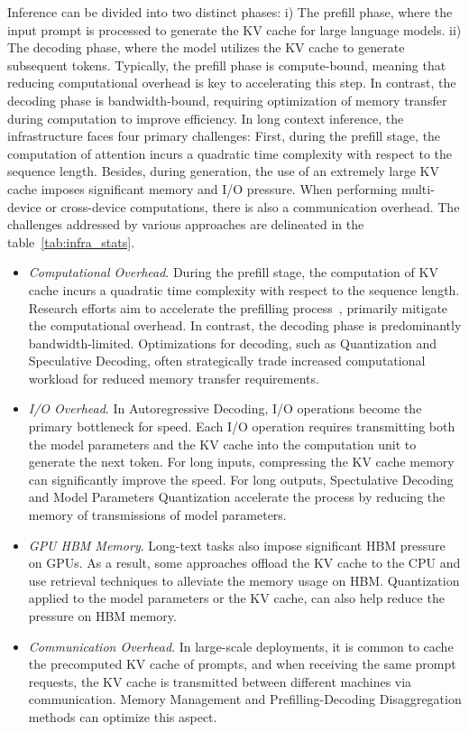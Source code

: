\documentclass[11pt, a4paper, logo, copyright, nonumbering]{map}
\begin{document}
Inference can be divided into two distinct phases: i) The prefill phase, where the input prompt is processed to generate the KV cache for large language models.
ii) The decoding phase, where the model utilizes the KV cache to generate subsequent tokens. Typically, the prefill phase is compute-bound, meaning that reducing computational overhead is key to accelerating this step. In contrast, the decoding phase is bandwidth-bound, requiring optimization of memory transfer during computation to improve efficiency.  In long context inference, the infrastructure faces four primary challenges:
First, during the prefill stage, the computation of attention incurs a quadratic time complexity with respect to the sequence length. Besides, during generation, the use of an extremely large KV cache imposes significant memory and I/O pressure. When performing multi-device or cross-device computations, there is also a communication overhead. The challenges addressed by various approaches are delineated in the table~\ref{tab:infra_stats}.

\begin{itemize}
\item \textit{Computational Overhead}.  During the prefill stage, the computation of KV cache incurs a quadratic time complexity with respect to the sequence length. Research efforts aim to accelerate the prefilling process~\citep{jiang2024minference,li2024scbench}, primarily mitigate the computational overhead. In contrast, the decoding phase is predominantly bandwidth-limited.  Optimizations for decoding, such as Quantization and Speculative Decoding, often strategically trade increased computational workload for reduced memory transfer requirements.  
\item \textit{I/O Overhead}. In Autoregressive Decoding, I/O operations become the primary bottleneck for speed. Each I/O operation requires transmitting both the model parameters and the KV cache into the computation unit to generate the next token. For long inputs, compressing the KV cache memory can significantly improve the speed. For long outputs, Spectulative Decoding and Model Parameters Quantization accelerate the process by reducing the memory of transmissions of model parameters. 
\item \textit{GPU HBM Memory}. 
Long-text tasks also impose significant HBM pressure on GPUs. As a result, some approaches offload the KV cache to the CPU and use retrieval techniques to alleviate the memory usage on HBM. Quantization applied to the model parameters or the KV cache, can also help reduce the pressure on HBM memory.
\item \textit{Communication Overhead}. In large-scale deployments, it is common to cache the precomputed KV cache of prompts, and when receiving the same prompt requests, the KV cache is transmitted between different machines via communication. Memory Management and Prefilling-Decoding Disaggregation methods can optimize this aspect.
\end{itemize}
\end{document}

